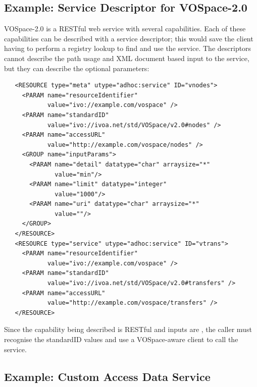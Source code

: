 \documentclass[11pt,a4paper]{ivoa}
\begin{document}
\subsection{Example: Service Descriptor for VOSpace-2.0}

VOSpace-2.0 is a RESTful web service with several capabilities. Each of
these capabilities can be described with a service descriptor; this would
save the client having to perform a registry lookup to find and use the
service. The descriptors cannot describe the path usage and XML document
based input to the service, but they can describe the optional parameters:
\begin{verbatim}
   <RESOURCE type="meta" utype="adhoc:service" ID="vnodes">
     <PARAM name="resourceIdentifier"
            value="ivo://example.com/vospace" />
     <PARAM name="standardID"
            value="ivo://ivoa.net/std/VOSpace/v2.0#nodes" />
     <PARAM name="accessURL"
            value="http://example.com/vospace/nodes" />
     <GROUP name="inputParams">
       <PARAM name="detail" datatype="char" arraysize="*"
              value="min"/>
       <PARAM name="limit" datatype="integer"
              value="1000"/>
       <PARAM name="uri" datatype="char" arraysize="*"
              value=""/>
     </GROUP>
   </RESOURCE>
   <RESOURCE type="service" utype="adhoc:service" ID="vtrans">
     <PARAM name="resourceIdentifier"
            value="ivo://example.com/vospace" />
     <PARAM name="standardID"
            value="ivo://ivoa.net/std/VOSpace/v2.0#transfers" />
     <PARAM name="accessURL"
            value="http://example.com/vospace/transfers" />
   </RESOURCE>
\end{verbatim}
Since the capability being described is RESTful and inputs are , the
caller must recognise the standardID values and use a VOSpace-aware
client to call the service.


\subsection{Example: Custom Access Data Service}
\end{document}
